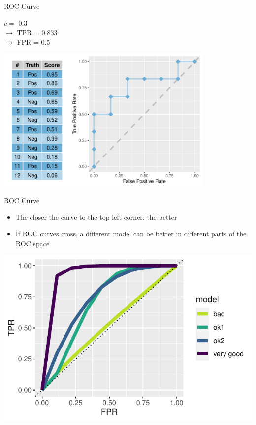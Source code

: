 \documentclass[11pt,compress,t,notes=noshow, xcolor=table]{beamer}
\newenvironment{knitrout}{}{} %
\begin{document}
\begin{vbframe}{ROC Curve}
\begin{knitrout}
{}



\end{knitrout}

$c =$ 0.3\\
$\rightarrow$ TPR = 0.833 \\
$\rightarrow$ FPR = 0.5

\framebreak

\begin{knitrout}\scriptsize
{}\color{fgcolor}

{\centering \includegraphics[width=0.8\textwidth]{figure/eval_mclass_roc_sp_11}

}



\end{knitrout}

\end{vbframe}

\begin{vbframe}{ROC Curve}
\begin{itemize}
  \item The closer the curve to the top-left corner, the better
  \item If ROC curves cross, a different model can be better in different parts of the ROC space
\end{itemize}
\begin{knitrout}\scriptsize
{}\color{fgcolor}

{\centering \includegraphics[width=.65\textwidth]{figure/eval_mclass_roc_sp_12}

}



\end{knitrout}
\end{vbframe}
\end{document}
